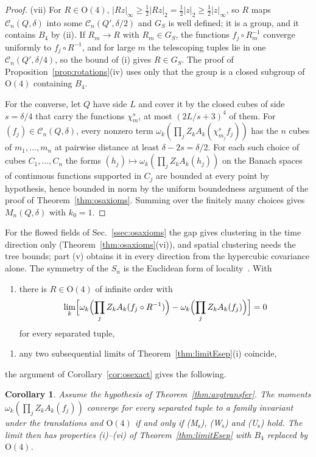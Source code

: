 \documentclass[aps,prd,twocolumn,superscriptaddress,nofootinbib,longbibliography,floatfix,amsmath,amssymb,10pt]{revtex4-2}
\newtheorem{corollary}[theorem]{Corollary}
\theoremstyle{definition}
\theoremstyle{remark}
\begin{document}
\begin{proof}
(vii) For $R\in\mathrm O(4)$, $|Rz|_\infty\ge\frac12|Rz|_2=\frac12|z|_2\ge
\frac12|z|_\infty$, so $R$ maps $\mathcal C_n(Q,\delta)$ into some
$\mathcal C_n(Q',\delta/2)$ and $G_S$ is well defined; it is a group, and it
contains $B_4$ by (ii). If $R_m\to R$ with $R_m\in G_S$, the functions
$f_j\circ R_m^{-1}$ converge uniformly to $f_j\circ R^{-1}$, and for large
$m$ the telescoping tuples lie in one $\mathcal C_n(Q',\delta/4)$, so the
bound of (i) gives $R\in G_S$. The proof of
Proposition~\ref{prop:rotations}(iv) uses only that the group is a closed
subgroup of $\mathrm O(4)$ containing $B_4$.

For the converse, let $Q$ have side $L$ and cover it by the closed cubes of side $s=\delta/4$ that
carry the functions $\chi^s_m$, at most $(2L/s+3)^4$ of them. For
$(f_j)\in\mathcal C_n(Q,\delta)$, every nonzero term
$\omega_k(\prod_jZ_kA_k(\chi^s_{m_j}f_j))$ has the $n$ cubes of
$m_1,\dots,m_n$ at pairwise distance at least $\delta-2s=\delta/2$. For each
such choice of cubes $C_1,\dots,C_n$ the forms $(h_j)\mapsto\omega_k(\prod_j
Z_kA_k(h_j))$ on the Banach spaces of continuous functions supported in
$C_j$ are bounded at every point by hypothesis, hence bounded in norm by the
uniform boundedness argument of the proof of Theorem~\ref{thm:osaxioms}.
Summing over the finitely many choices gives $M_n(Q,\delta)$ with $k_0=1$.
\end{proof}

For the flowed fields of Sec.~\ref{ssec:osaxioms} the gap gives clustering
in the time direction only (Theorem~\ref{thm:osaxioms}(vi)), and spatial
clustering needs the tree bounds; part (v) obtains it in every direction
from the hypercubic covariance alone. The symmetry of the $S_n$ is the
Euclidean form of locality~\cite{OS73}. With
\begin{enumerate}[label=\textup{(W$_{\mathrm s}$)},leftmargin=*]
\item there is $R\in\mathrm O(4)$ of infinite order with
\[
\lim_k\Bigl[\omega_k\Bigl(\prod_jZ_kA_k(f_j\circ R^{-1})\Bigr)-\omega_k
\Bigl(\prod_jZ_kA_k(f_j)\Bigr)\Bigr]=0
\]
for every separated tuple,
\end{enumerate}
\begin{enumerate}[label=\textup{(U$_{\mathrm s}$)},leftmargin=*]
\item any two subsequential limits of Theorem~\ref{thm:limitEsep}(i)
coincide,
\end{enumerate}
the argument of Corollary~\ref{cor:osexact} gives the following.

\begin{corollary}\label{cor:limitEexact}
Assume the hypothesis of Theorem~\textup{\ref{thm:avgtransfer}}. The
moments $\omega_k(\prod_jZ_kA_k(f_j))$ converge for every separated tuple to
a family invariant under the translations and $\mathrm O(4)$ if and only if
\textup{(M$_{\mathrm s}$)}, \textup{(W$_{\mathrm s}$)} and
\textup{(U$_{\mathrm s}$)} hold. The limit then has properties
\textup{(i)--(vi)} of Theorem~\textup{\ref{thm:limitEsep}} with $B_4$
replaced by $\mathrm O(4)$.
\end{corollary}
\end{document}
